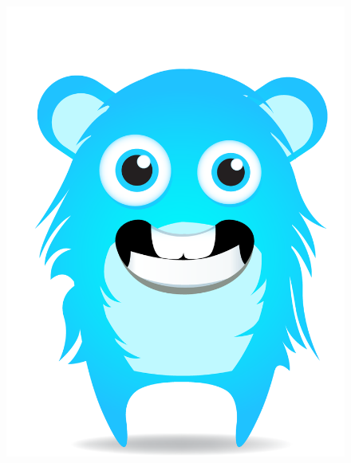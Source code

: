 \documentclass[twoside]{ctuthesis}
\theoremstyle{plain}
\theoremstyle{definition}
\theoremstyle{note}
\begin{document}
\begin{figure}[]
    \includegraphics[width=(0.25\textwidth)]{images/avatars/avatar-lightblue.png}
    \hspace{0.1\textwidth}

\end{figure}
\end{document}
